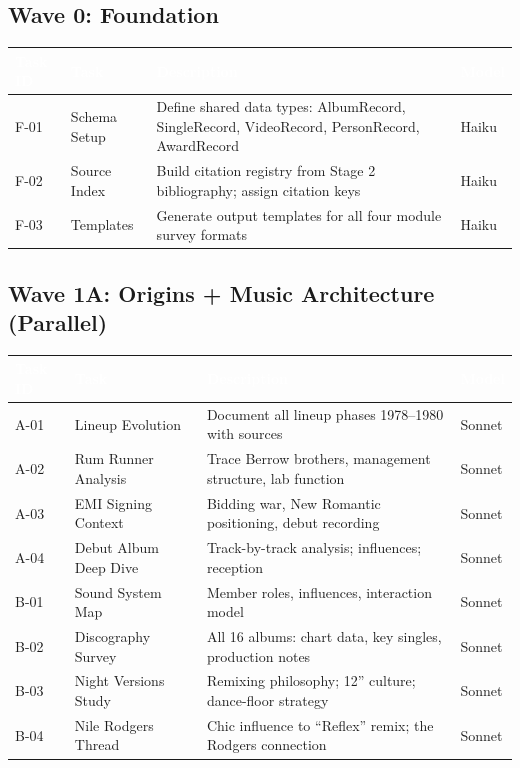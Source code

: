 \documentclass[11pt,letterpaper]{article}
\newcommand{\tableheader}[1]{\textbf{\sffamily\textcolor{white}{#1}}}
\begin{document}
\subsection{Wave 0: Foundation}

\begin{center}
\begin{tabularx}{\textwidth}{L{2cm}L{3.5cm}XC{2cm}}
\toprule
{}
\tableheader{Task ID} & \tableheader{Task} & \tableheader{Description} & \tableheader{Model} \\
\midrule
F-01 & Schema Setup & Define shared data types: AlbumRecord, SingleRecord, VideoRecord, PersonRecord, AwardRecord & Haiku \\
F-02 & Source Index & Build citation registry from Stage 2 bibliography; assign citation keys & Haiku \\
F-03 & Templates & Generate output templates for all four module survey formats & Haiku \\
\bottomrule
\end{tabularx}
\end{center}

\subsection{Wave 1A: Origins + Music Architecture (Parallel)}

\begin{center}
\begin{tabularx}{\textwidth}{L{2cm}L{3.5cm}XC{2cm}}
\toprule
{}
\tableheader{Task ID} & \tableheader{Task} & \tableheader{Description} & \tableheader{Model} \\
\midrule
A-01 & Lineup Evolution & Document all lineup phases 1978--1980 with sources & Sonnet \\
A-02 & Rum Runner Analysis & Trace Berrow brothers, management structure, lab function & Sonnet \\
A-03 & EMI Signing Context & Bidding war, New Romantic positioning, debut recording & Sonnet \\
A-04 & Debut Album Deep Dive & Track-by-track analysis; influences; reception & Sonnet \\
B-01 & Sound System Map & Member roles, influences, interaction model & Sonnet \\
B-02 & Discography Survey & All 16 albums: chart data, key singles, production notes & Sonnet \\
B-03 & Night Versions Study & Remixing philosophy; 12'' culture; dance-floor strategy & Sonnet \\
B-04 & Nile Rodgers Thread & Chic influence to ``Reflex'' remix; the Rodgers connection & Sonnet \\
\bottomrule
\end{tabularx}
\end{center}
\end{document}
